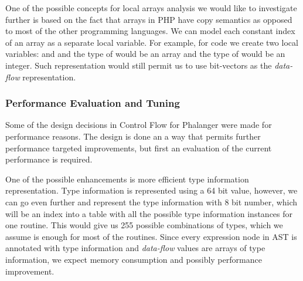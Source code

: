         One of the possible concepts for local arrays 
        analysis we would like to investigate further 
        is based on the fact that arrays in PHP have 
        copy semantics as opposed to most of the other 
        programming languages. We can model each constant 
        index of an array as a separate local variable. 
        For example, for code  we create 
        two local variables:  and  
        and the type of  would be an array and 
        the type of  would be an integer. 
        Such representation would still permit us to use 
        bit-vectors as the \emph{data-flow} representation.
        
        \subsubsection*{Performance Evaluation and Tuning}
        Some of the design decisions in Control Flow for 
        Phalanger were made for performance reasons. The 
        design is done an a way that permits further 
        performance targeted improvements, but first 
        an evaluation of the current performance is 
        required.
        
        One of the possible enhancements is more efficient 
        type information representation. Type information 
        is represented using a 64 bit value, however, 
        we can go even further and represent the type 
        information with 8 bit number, which will be an index 
        into a table with all the possible type information 
        instances for one routine. This would give us 255 
        possible combinations of types, which we assume is 
        enough for most of the routines. Since every expression 
        node in AST is annotated with type information and 
        \emph{data-flow} values are arrays of 
        type information, we expect memory consumption 
        and possibly performance improvement.
        
        